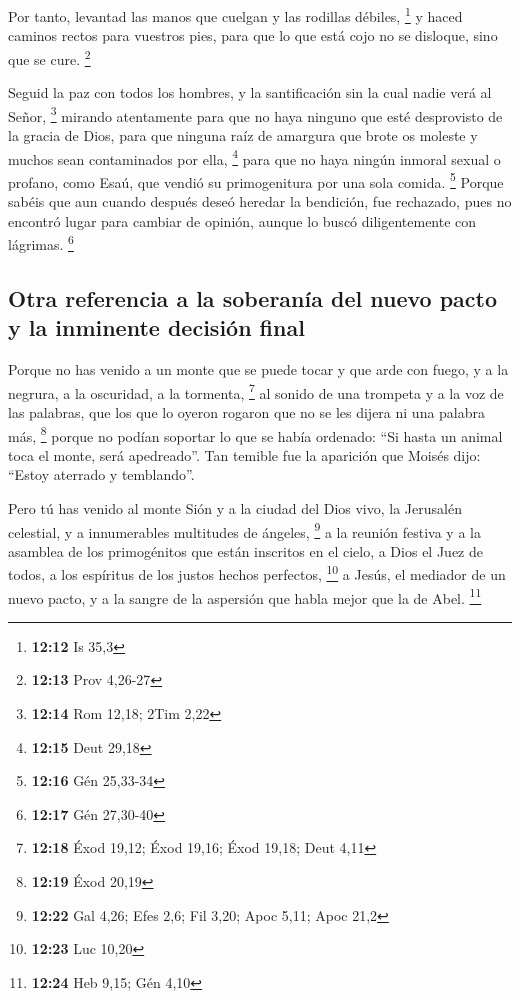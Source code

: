 \begin{paracol}{2}
 Por tanto, levantad las manos que cuelgan y las rodillas
débiles, \footnote{\textbf{12:12} Is 35,3}  y haced
caminos rectos para vuestros pies, para que lo que está cojo no se
disloque, sino que se cure. \footnote{\textbf{12:13} Prov 4,26-27}

 Seguid la paz con todos los hombres, y la santificación
sin la cual nadie verá al Señor, \footnote{\textbf{12:14} Rom 12,18;
  2Tim 2,22}  mirando atentamente para que no haya
ninguno que esté desprovisto de la gracia de Dios, para que ninguna raíz
de amargura que brote os moleste y muchos sean contaminados por ella,
\footnote{\textbf{12:15} Deut 29,18}  para que no haya
ningún inmoral sexual o profano, como Esaú, que vendió su primogenitura
por una sola comida. \footnote{\textbf{12:16} Gén 25,33-34}
 Porque sabéis que aun cuando después deseó heredar la
bendición, fue rechazado, pues no encontró lugar para cambiar de
opinión, aunque lo buscó diligentemente con lágrimas. \footnote{\textbf{12:17}
  Gén 27,30-40}

\hypertarget{otra-referencia-a-la-soberanuxeda-del-nuevo-pacto-y-la-inminente-decisiuxf3n-final}{%
\subsection{Otra referencia a la soberanía del nuevo pacto y la
inminente decisión
final}\label{otra-referencia-a-la-soberanuxeda-del-nuevo-pacto-y-la-inminente-decisiuxf3n-final}}

 Porque no has venido a un monte que se puede tocar y que
arde con fuego, y a la negrura, a la oscuridad, a la tormenta,
\footnote{\textbf{12:18} Éxod 19,12; Éxod 19,16; Éxod 19,18; Deut 4,11}
 al sonido de una trompeta y a la voz de las palabras,
que los que lo oyeron rogaron que no se les dijera ni una palabra más,
\footnote{\textbf{12:19} Éxod 20,19}  porque no podían
soportar lo que se había ordenado: ``Si hasta un animal toca el monte,
será apedreado''.  Tan temible fue la aparición que
Moisés dijo: ``Estoy aterrado y temblando''.

 Pero tú has venido al monte Sión y a la ciudad del Dios
vivo, la Jerusalén celestial, y a innumerables multitudes de ángeles,
\footnote{\textbf{12:22} Gal 4,26; Efes 2,6; Fil 3,20; Apoc 5,11; Apoc
  21,2}  a la reunión festiva y a la asamblea de los
primogénitos que están inscritos en el cielo, a Dios el Juez de todos, a
los espíritus de los justos hechos perfectos, \footnote{\textbf{12:23}
  Luc 10,20}  a Jesús, el mediador de un nuevo pacto, y a
la sangre de la aspersión que habla mejor que la de Abel. \footnote{\textbf{12:24}
  Heb 9,15; Gén 4,10}


\end{paracol}
